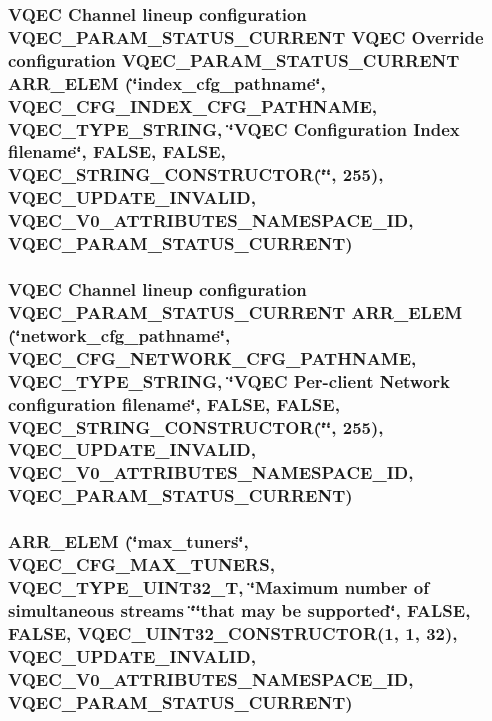 \subsubsection{\setlength{\rightskip}{0pt plus 5cm}VQEC Channel lineup configuration VQEC\_\-PARAM\_\-STATUS\_\-CURRENT VQEC Override configuration VQEC\_\-PARAM\_\-STATUS\_\-CURRENT ARR\_\-ELEM (\char`\"{}index\_\-cfg\_\-pathname\char`\"{}, VQEC\_\-CFG\_\-INDEX\_\-CFG\_\-PATHNAME, \bf{VQEC\_\-TYPE\_\-STRING}, \char`\"{}VQEC Configuration Index \bf{filename}\char`\"{}, \bf{FALSE}, \bf{FALSE}, VQEC\_\-STRING\_\-CONSTRUCTOR(\char`\"{}\char`\"{}, 255), \bf{VQEC\_\-UPDATE\_\-INVALID}, \bf{VQEC\_\-V0\_\-ATTRIBUTES\_\-NAMESPACE\_\-ID}, VQEC\_\-PARAM\_\-STATUS\_\-CURRENT)}\label{vqec__cfg__settings_8h_c158da076b728569dcdf81bfc6124e99}


\subsubsection{\setlength{\rightskip}{0pt plus 5cm}VQEC Channel lineup configuration VQEC\_\-PARAM\_\-STATUS\_\-CURRENT ARR\_\-ELEM (\char`\"{}network\_\-cfg\_\-pathname\char`\"{}, VQEC\_\-CFG\_\-NETWORK\_\-CFG\_\-PATHNAME, \bf{VQEC\_\-TYPE\_\-STRING}, \char`\"{}VQEC Per-client Network configuration \bf{filename}\char`\"{}, \bf{FALSE}, \bf{FALSE}, VQEC\_\-STRING\_\-CONSTRUCTOR(\char`\"{}\char`\"{}, 255), \bf{VQEC\_\-UPDATE\_\-INVALID}, \bf{VQEC\_\-V0\_\-ATTRIBUTES\_\-NAMESPACE\_\-ID}, VQEC\_\-PARAM\_\-STATUS\_\-CURRENT)}\label{vqec__cfg__settings_8h_e5059a2568590b53b109896956eaac45}


\subsubsection{\setlength{\rightskip}{0pt plus 5cm}ARR\_\-ELEM (\char`\"{}max\_\-tuners\char`\"{}, VQEC\_\-CFG\_\-MAX\_\-TUNERS, \bf{VQEC\_\-TYPE\_\-UINT32\_\-T}, \char`\"{}Maximum number of simultaneous streams \char`\"{}\char`\"{}that may be supported\char`\"{}, \bf{FALSE}, \bf{FALSE}, VQEC\_\-UINT32\_\-CONSTRUCTOR(1, 1, 32), \bf{VQEC\_\-UPDATE\_\-INVALID}, \bf{VQEC\_\-V0\_\-ATTRIBUTES\_\-NAMESPACE\_\-ID}, VQEC\_\-PARAM\_\-STATUS\_\-CURRENT)}\label{vqec__cfg__settings_8h_a219ee708e6588c5116673dd9848d1d3}


